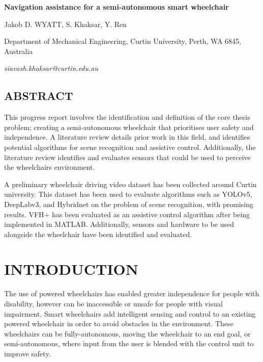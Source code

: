 \documentclass[10pt,twoside]{article}
\begin{document}
\begin{center}
\fontsize{12}{14.4}\selectfont
\textbf{Navigation assistance for a semi-autonomous smart wheelchair}
\fontsize{11}{13.2}\selectfont

\vspace{11pt}

Jakob D. WYATT, S. Khaksar, Y. Ren

\vspace{11pt}

Department of Mechanical Engineering, Curtin University, Perth, WA 6845, Australia

\vspace{11pt}

\end{center}
\begin{flushright}
\textit{siavash.khaksar@curtin.edu.au}
\end{flushright}

\begin{adjustwidth}{10mm}{10mm}
\section*{\textbf{ABSTRACT}}
This progress report involves the identification and definition of the core thesis problem;
creating a semi-autonomous wheelchair that prioritises user safety and independence.
A literature review details prior work in this field, and identifies potential algorithms
for scene recognition and assistive control. Additionally, the literature review identifies and evaluates
sensors that could be used to perceive the wheelchairs environment.

A preliminary wheelchair driving video dataset has been collected around Curtin university.
This dataset has been used to evaluate algorithms such as YOLOv5, DeepLabv3, and Hybridnet on
the problem of scene recognition, with promising results. VFH+ has been evaluated as an assistive
control algorithm after being implemented in MATLAB. Additionally, sensors and hardware to be used
alongside the wheelchair have been identified and evaluated.
\end{adjustwidth}

\section*{\textbf{INTRODUCTION}}
The use of powered wheelchairs has enabled greater independence for people with disability,
however can be inaccessible or unsafe for people with visual impairment.
Smart wheelchairs add intelligent sensing and control to an existing powered wheelchair
in order to avoid obstacles in the environment. These wheelchairs can be fully-autonomous, moving the wheelchair
to an end goal, or semi-autonomous, where input from the user is blended with the control unit to improve safety.
\end{document}
